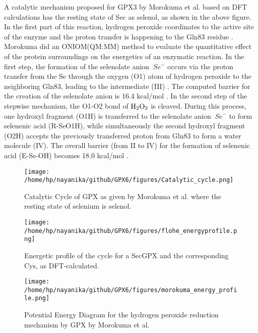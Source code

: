 \documentclass[journal=jacsat,manuscript=article]{achemso}
\begin{document}
A catalytic mechanism proposed for GPX3 by Morokuma et al. based on DFT calculations has the resting state of Sec as selenol, as shown in the above figure. In the first part of this reaction, hydrogen peroxide coordinates to the active site of the enzyme and the proton transfer is happening to the Gln83 residue \cite{Prabhakar2006, Prabhakar2005}. Morokuma \cite{Prabhakar2006} did an ONIOM(QM:MM) method to evaluate the quantitative effect of the protein surroundings on the energetics of an enzymatic reaction. In the first step, the formation of the selenolate anion \({\ Se^-}\) occurs via the proton transfer from the Se through the oxygen (O1) atom of hydrogen peroxide to the neighboring Gln83, leading to the intermediate (III) \cite{Prabhakar2006}. The computed barrier for the creation of the selenolate anion is 16.4 kcal/mol \cite{Prabhakar2006}. In the second step of the stepwise mechanism, the O1-O2 bond of $\ce{H_2O_2}$ is cleaved. During this process, one hydroxyl fragment (O1H) is transferred to the selenolate anion \({\ Se^-}\) to form selenenic acid (R-SeO1H), while simultaneously the second hydroxyl fragment (O2H) accepts the previously transferred proton from Gln83 to form a water molecule (IV). The overall barrier (from II to IV) for the formation of selenenic acid (E-Se-OH) becomes 18.0 kcal/mol \cite{Prabhakar2006}.

\begin{figure}[h]
\texttt{[image: /home/hp/nayanika/github/GPX6/figures/Catalytic\_cycle.png]}
\caption{Catalytic Cycle of GPX as given by Morokuma et al. where the resting state of selenium is selenol.}
\label{fig:figure1}
\end{figure}

\begin{wrapfigure}{h}{0.7\textwidth}
\texttt{[image: /home/hp/nayanika/github/GPX6/figures/flohe\_energyprofile.png]} 
\caption{Energetic profile of the cycle for a SecGPX and the corresponding Cys, as DFT-calculated.}
\label{fig:figure2}
\end{wrapfigure}

\begin{figure}[h]
\texttt{[image: /home/hp/nayanika/github/GPX6/figures/morokuma\_energy\_profile.png]}
\caption{Potential Energy Diagram for the hydrogen peroxide reduction mechanism by GPX by Morokuma et al.}
\label{fig:figure3}
\end{figure}
\end{document}
